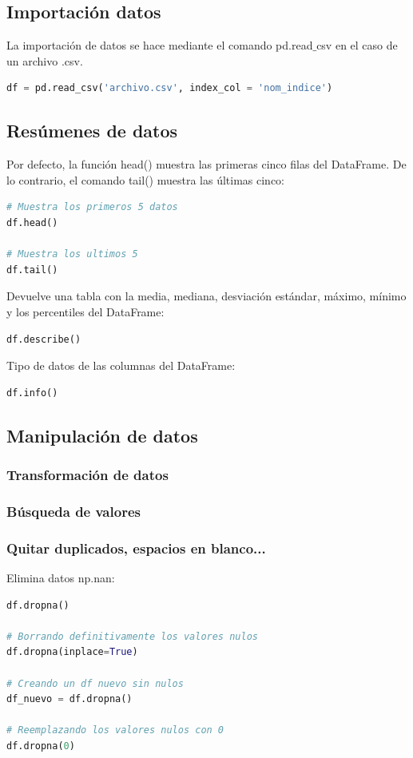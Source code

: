 \documentclass[a4paper, 12pt]{book}
\begin{document}
\subsection{Importación datos}
La importación de datos se hace mediante el comando pd.read$\_$csv en el caso de un archivo .csv.
\begin{lstlisting}[language=Python]
df = pd.read_csv('archivo.csv', index_col = 'nom_indice')
\end{lstlisting}

\subsection{Resúmenes de datos}
Por defecto, la función head() muestra las primeras cinco filas del DataFrame. De lo contrario, el comando tail() muestra las últimas cinco:
\begin{lstlisting}[language=Python]
# Muestra los primeros 5 datos
df.head()
	
# Muestra los ultimos 5
df.tail()
\end{lstlisting}

Devuelve una tabla con la media, mediana, desviación estándar, máximo, mínimo y los percentiles del DataFrame:
\begin{lstlisting}[language=Python]
df.describe()
\end{lstlisting}

Tipo de datos de las columnas del DataFrame:
\begin{lstlisting}[language=Python]
df.info()
\end{lstlisting}


\subsection{Manipulación de datos}



\subsubsection{Transformación de datos}


\subsubsection{Búsqueda de valores}

\subsubsection{Quitar duplicados, espacios en blanco...}
Elimina datos np.nan:
\begin{lstlisting}[language=Python]
df.dropna()
	
# Borrando definitivamente los valores nulos
df.dropna(inplace=True)
	
# Creando un df nuevo sin nulos
df_nuevo = df.dropna()
	
# Reemplazando los valores nulos con 0
df.dropna(0)
\end{lstlisting}
\end{document}
